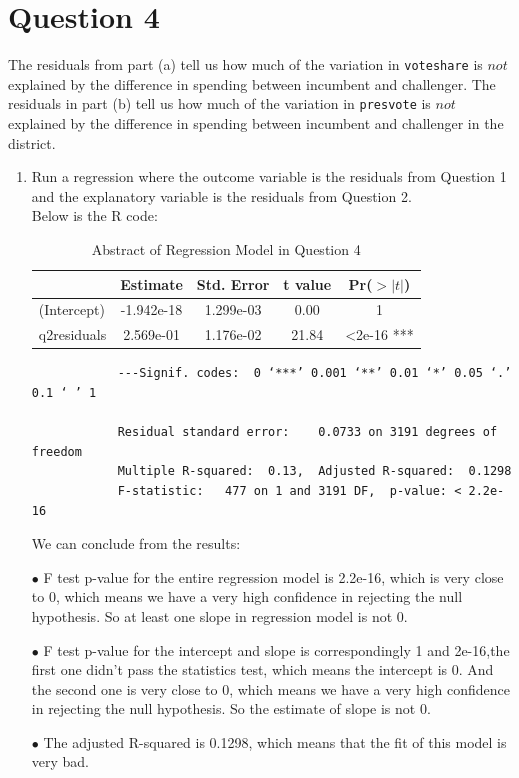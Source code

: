 \documentclass[12pt,letterpaper]{article}
\begin{document}
\newpage	
\section*{Question 4}
\noindent The residuals from part (a) tell us how much of the variation in \texttt{voteshare} is $not$ explained by the difference in spending between incumbent and challenger. The residuals in part (b) tell us how much of the variation in \texttt{presvote} is $not$ explained by the difference in spending between incumbent and challenger in the district.
	\begin{enumerate}
		\item Run a regression where the outcome variable is the residuals from Question 1 and the explanatory variable is the residuals from Question 2.\\
		
		Below is the R code:
		
		
		\begin{table}[ht]
			\centering
			\caption{Abstract of Regression Model in Question 4}
			\begin{tabular}{lcccc}
				\toprule
				& Estimate & Std. Error & t value & Pr($>|t|$) \\
				\midrule
				(Intercept) & -1.942e-18 &1.299e-03 & 0.00 & 1 \\
				q2residuals & 2.569e-01 & 1.176e-02 & 21.84 & <2e-16 *** \\
				\bottomrule
			\end{tabular} 
		\end{table}
		\begin{verbatim}
			---Signif. codes:  0 ‘***’ 0.001 ‘**’ 0.01 ‘*’ 0.05 ‘.’ 0.1 ‘ ’ 1
			
			Residual standard error: 	0.0733 on 3191 degrees of freedom
			Multiple R-squared:  0.13,	Adjusted R-squared:  0.1298 
			F-statistic:   477 on 1 and 3191 DF,  p-value: < 2.2e-16
		\end{verbatim}
		We can conclude from the results:
		\item[$\bullet$] F test p-value for the entire regression model is 2.2e-16, which is very close to 0, which means we have a very high confidence in rejecting the null hypothesis. So at least one slope in regression model is not 0.
		\item[$\bullet$] F test p-value for the intercept and slope is correspondingly 1 and 2e-16,the first one didn't pass the statistics test, which means the intercept is 0. And the second one is very close to 0,  which means we have a very high confidence in rejecting the null hypothesis. So the estimate of slope is not 0.
		\item[$\bullet$] The adjusted R-squared is 0.1298, which means that the fit of this model is very bad.
		

\end{enumerate}
\end{document}
